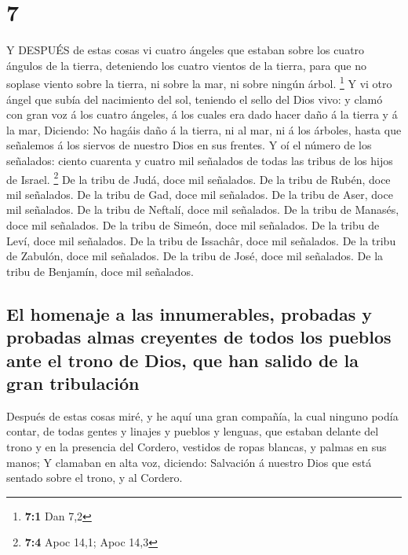 \hypertarget{section-6}{%
\section{7}\label{section-6}}

 Y DESPUÉS de estas cosas vi cuatro ángeles que estaban
sobre los cuatro ángulos de la tierra, deteniendo los cuatro vientos de
la tierra, para que no soplase viento sobre la tierra, ni sobre la mar,
ni sobre ningún árbol. \footnote{\textbf{7:1} Dan 7,2}  Y vi
otro ángel que subía del nacimiento del sol, teniendo el sello del Dios
vivo: y clamó con gran voz á los cuatro ángeles, á los cuales era dado
hacer daño á la tierra y á la mar,  Diciendo: No hagáis daño
á la tierra, ni al mar, ni á los árboles, hasta que señalemos á los
siervos de nuestro Dios en sus frentes.  Y oí el número de
los señalados: ciento cuarenta y cuatro mil señalados de todas las
tribus de los hijos de Israel. \footnote{\textbf{7:4} Apoc 14,1; Apoc
  14,3}  De la tribu de Judá, doce mil señalados. De la
tribu de Rubén, doce mil señalados. De la tribu de Gad, doce mil
señalados.  De la tribu de Aser, doce mil señalados. De la
tribu de Neftalí, doce mil señalados. De la tribu de Manasés, doce mil
señalados.  De la tribu de Simeón, doce mil señalados. De la
tribu de Leví, doce mil señalados. De la tribu de Issachâr, doce mil
señalados.  De la tribu de Zabulón, doce mil señalados. De
la tribu de José, doce mil señalados. De la tribu de Benjamín, doce mil
señalados.

\hypertarget{el-homenaje-a-las-innumerables-probadas-y-probadas-almas-creyentes-de-todos-los-pueblos-ante-el-trono-de-dios-que-han-salido-de-la-gran-tribulaciuxf3n}{%
\subsection{El homenaje a las innumerables, probadas y probadas almas
creyentes de todos los pueblos ante el trono de Dios, que han salido de
la gran
tribulación}\label{el-homenaje-a-las-innumerables-probadas-y-probadas-almas-creyentes-de-todos-los-pueblos-ante-el-trono-de-dios-que-han-salido-de-la-gran-tribulaciuxf3n}}

 Después de estas cosas miré, y he aquí una gran compañía,
la cual ninguno podía contar, de todas gentes y linajes y pueblos y
lenguas, que estaban delante del trono y en la presencia del Cordero,
vestidos de ropas blancas, y palmas en sus manos;  Y
clamaban en alta voz, diciendo: Salvación á nuestro Dios que está
sentado sobre el trono, y al Cordero.

